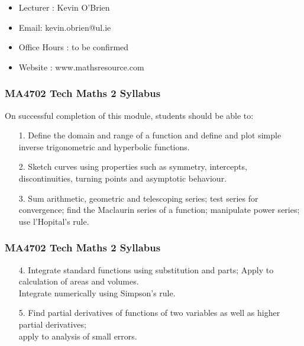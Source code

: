 \documentclass{beamer}
\begin{document}
	\begin{frame}
		\Large
		\begin{itemize}
			\item Lecturer :  Kevin O'Brien
			\item Email: kevin.obrien@ul.ie
			\item Office Hours : to be confirmed
			\item Website : www.mathsresource.com 
		\end{itemize}
	\end{frame}
	

\begin{frame}
	\frametitle{MA4702 Tech Maths 2 Syllabus}
	
On successful completion of this module, students should be able to:
\begin{itemize}
\item[1.] Define the domain and range of a function and define and plot simple inverse trigonometric and hyperbolic  functions. 

\item[2.] Sketch curves using properties such as symmetry, intercepts, discontinuities, turning points and asymptotic behaviour. 

\item[3.] Sum arithmetic, geometric and telescoping series; test series for convergence; find the Maclaurin series of a function; manipulate power series; use l'Hopital's rule. 
\end{itemize}
\end{frame}

\begin{frame}
\frametitle{MA4702 Tech Maths 2 Syllabus}
	
\begin{itemize}
	\item[4.] Integrate standard functions using substitution and parts; Apply to calculation of areas and volumes. \\ Integrate numerically using Simpson's rule. 

\item[5.] Find partial derivatives of functions of two variables as well as higher partial derivatives;\\ apply to analysis of small errors.
\end{itemize}
\end{frame}
\end{document}
